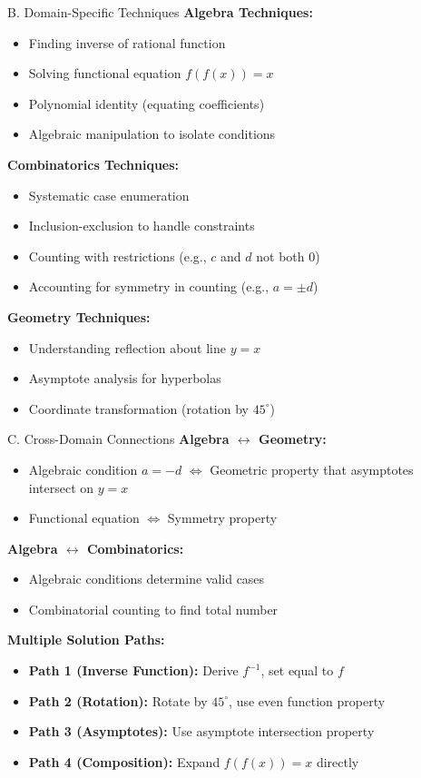 \documentclass[12pt]{article}
\begin{document}
\begin{tacticsbox}{B. Domain-Specific Techniques}
\textbf{Algebra Techniques:}
\begin{itemize}
    \item Finding inverse of rational function
    \item Solving functional equation $f(f(x)) = x$
    \item Polynomial identity (equating coefficients)
    \item Algebraic manipulation to isolate conditions
\end{itemize}

\textbf{Combinatorics Techniques:}
\begin{itemize}
    \item Systematic case enumeration
    \item Inclusion-exclusion to handle constraints
    \item Counting with restrictions (e.g., $c$ and $d$ not both 0)
    \item Accounting for symmetry in counting (e.g., $a=\pm d$)
\end{itemize}

\textbf{Geometry Techniques:}
\begin{itemize}
    \item Understanding reflection about line $y=x$
    \item Asymptote analysis for hyperbolas
    \item Coordinate transformation (rotation by $45^\circ$)
\end{itemize}
\end{tacticsbox}

\begin{tacticsbox}{C. Cross-Domain Connections}
\textbf{Algebra $\leftrightarrow$ Geometry:}
\begin{itemize}
    \item Algebraic condition $a=-d$ $\Leftrightarrow$ Geometric property that asymptotes intersect on $y=x$
    \item Functional equation $\Leftrightarrow$ Symmetry property
\end{itemize}

\textbf{Algebra $\leftrightarrow$ Combinatorics:}
\begin{itemize}
    \item Algebraic conditions determine valid cases
    \item Combinatorial counting to find total number
\end{itemize}

\textbf{Multiple Solution Paths:}
\begin{itemize}
    \item \textbf{Path 1 (Inverse Function):} Derive $f^{-1}$, set equal to $f$
    \item \textbf{Path 2 (Rotation):} Rotate by $45^\circ$, use even function property
    \item \textbf{Path 3 (Asymptotes):} Use asymptote intersection property
    \item \textbf{Path 4 (Composition):} Expand $f(f(x))=x$ directly
\end{itemize}
\end{tacticsbox}
\end{document}

